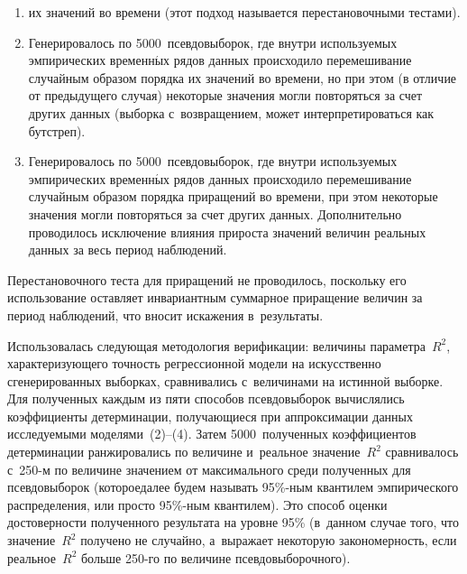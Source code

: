\begin{multicols}{2}
\begin{enumerate}[1.]
\pagebreak

\item[ ] их значений во времени (этот подход называется 
перестановочными тестами).\\[-8pt]
  \item Генерировалось по 5000~псевдовыборок, где внутри используемых 
эмпирических временн$\acute{\mbox{ы}}$х рядов данных происходило перемешивание случайным 
образом порядка
 их значений %
 во времени, но при этом (в отличие от предыду\-ще\-го 
случая) некоторые значения могли повторяться за счет других данных (выборка 
с~возвращением, может интерпретироваться как \mbox{бутстреп}).\\[-8pt]
  \item Генерировалось по 5000~псевдовыборок, где внут\-ри используемых 
эмпирических вре\-мен\-н$\acute{\mbox{ы}}$х рядов данных происходило перемешивание случайным 
образом порядка приращений %
 во времени, при этом некоторые значения могли 
повторяться за счет других данных. Дополнительно проводилось исключение влияния 
прироста значений величин реальных \mbox{данных} за весь период наблюдений.
  \end{enumerate}
  
  Перестановочного теста для приращений не проводилось, поскольку его 
использование остав\-ля\-ет инвариантным суммарное приращение величин за период 
наблюдений, что вносит искажения в~результаты.
  
  Использовалась следующая методология верификации: величины параметра~$R^2$, 
характеризующего точность регрессионной модели на искусственно сгенерированных 
выборках, сравнивались с~величинами на истинной выборке. Для полученных каждым 
из пяти способов псевдовыборок вычислялись коэффициенты детерминации, 
получающиеся при аппроксимации данных ис\-сле\-ду\-емы\-ми моделями~(2)--(4). Затем 
5000~полученных коэффициентов детерминации ранжировались по величине 
и~реальное значение~$R^2$ сравнивалось с~250-м по величине значением от 
максимального среди полученных для псевдовыборок (которое\linebreak далее будем называть 
95\%-ным квантилем эмпирического распределения, или просто 95\%-ным квантилем). 
Это способ оценки достоверности полученного результата на уровне 95\% (в~данном 
случае того, что значение~$R^2$ получено не случайно, а~выражает некоторую 
закономерность, если реальное~$R^2$ больше 250-го по величине псевдовыборочного).
{ %

}
\end{multicols}
